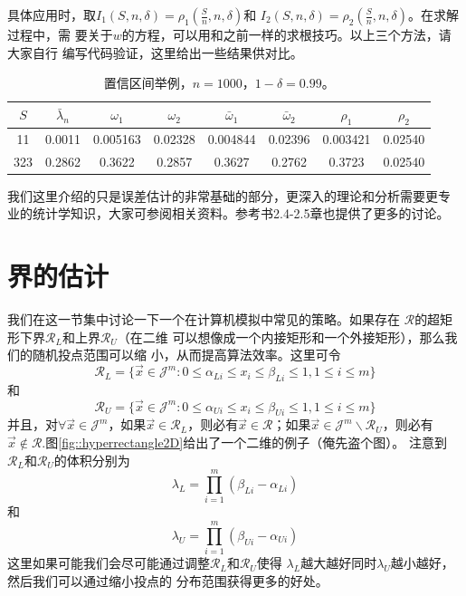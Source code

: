 具体应用时，取$I_1(S, n, \delta) = \rho_1(\frac{S}{n}, n, \delta)$和
$I_2(S, n, \delta) = \rho_2(\frac{S}{n}, n, \delta)$。在求解过程中，需
要关于$w$的方程，可以用和之前一样的求根技巧。以上三个方法，请大家自行
编写代码验证，这里给出一些结果供对比。

\begin{table}[!ht]
   \centering
   \caption{置信区间举例，$n = 1000$，$1 - \delta = 0.99$。}
   \label{table::confidence_intervals_2}
\begin{tabular}{|c|c|c|c|c|c|c|c|}
 \hline
 $S$ & $\bar{\lambda}_n$ & $\omega_1$ & $\omega_2$&
 $\bar{\omega}_1$&$\bar{\omega}_2$&
 $\rho_1$&$\rho_2$\\
 \hline
 11&0.0011&0.005163&0.02328&0.004844&0.02396&0.003421&0.02540\\
 \hline
 323&0.2862&0.3622&0.2857&0.3627&0.2762&0.3723&0.02540\\
 \hline
\end{tabular}
\end{table}

我们这里介绍的只是误差估计的非常基础的部分，更深入的理论和分析需要更专
业的统计学知识，大家可参阅相关资料。参考书2.4-2.5章也提供了更多的讨论。

\section{界的估计}
我们在这一节集中讨论一下一个在计算机模拟中常见的策略。如果存在
$\mathscr{R}$的超矩形下界$\mathscr{R}_L$和上界$\mathscr{R}_U$（在二维
  可以想像成一个内接矩形和一个外接矩形），那么我们的随机投点范围可以缩
小，从而提高算法效率。这里可令
\begin{equation}
  \mathscr{R}_{L} = \{\vec{x} \in \mathscr{J}^m : 0 \leq \alpha_{Li} \leq x_i
  \leq \beta_{Li} \leq 1, 1 \leq i \leq m\}
\end{equation}
和
\begin{equation}
  \mathscr{R}_{U} = \{\vec{x} \in \mathscr{J}^m : 0 \leq \alpha_{Ui} \leq x_i
  \leq \beta_{Ui} \leq 1, 1 \leq i \leq m\}
\end{equation}
并且，对$\forall \vec{x} \in \mathscr{J}^m$，如果$\vec{x} \in
\mathscr{R}_L$，则必有$\vec{x} \in \mathscr{R}$；如果$\vec{x} \in
\mathscr{J}^m \backslash \mathscr{R}_U$，则必有$\vec{x} \notin
\mathscr{R}$.图\ref{fig::hyperrectangle2D}给出了一个二维的例子（俺先盗个图）。
注意到$\mathscr{R}_L$和$\mathscr{R}_U$的体积分别为
\begin{equation}
  \lambda_L = \prod_{i = 1}^m(\beta_{Li} - \alpha_{Li})
  \label{eq::area_lower}
\end{equation}
和
\begin{equation}
  \lambda_U = \prod_{i = 1}^m(\beta_{Ui} - \alpha_{Ui})
  \label{eq::area_upper}
\end{equation}
这里如果可能我们会尽可能通过调整$\mathscr{R}_L$和$\mathscr{R}_U$使得
$\lambda_L$越大越好同时$\lambda_U$越小越好，然后我们可以通过缩小投点的
分布范围获得更多的好处。

